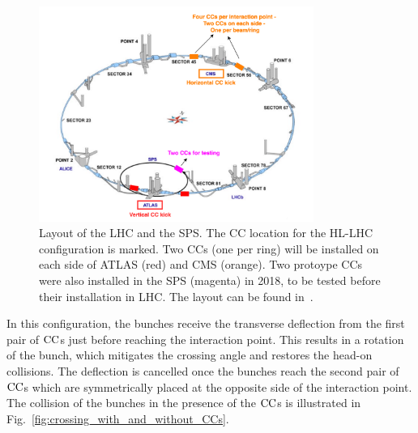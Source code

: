 \begin{figure}[!h] %
    \centering         
    \includegraphics[width=0.8\textwidth]{images/introduction/LHC_layout_CCs.png}
        \caption{Layout of the LHC and the SPS. The CC location for the HL-LHC configuration is marked. Two CCs (one per ring) will be installed on each side of ATLAS (red) and CMS (orange). Two protoype CCs were also installed in the SPS (magenta) in 2018, to be tested before their installation in LHC. The layout can be found in~\cite{LHC_SPS_layout}.}%
        \label{fig:LHC_layout_CCs}
 \end{figure}

In this configuration, the bunches receive the transverse deflection from the first pair of ${\mathrm{CC}}$s just before reaching the interaction point. This results in a rotation of the bunch, which mitigates the crossing angle and restores the head-on collisions. The deflection is cancelled once the bunches reach the second pair of ${\mathrm{CC}}$s which are symmetrically placed at the opposite side of the interaction point. The collision of the bunches in the presence of the ${\mathrm{CC}}$s is illustrated in Fig.~\ref{fig:crossing_with_and_without_CCs}.%

